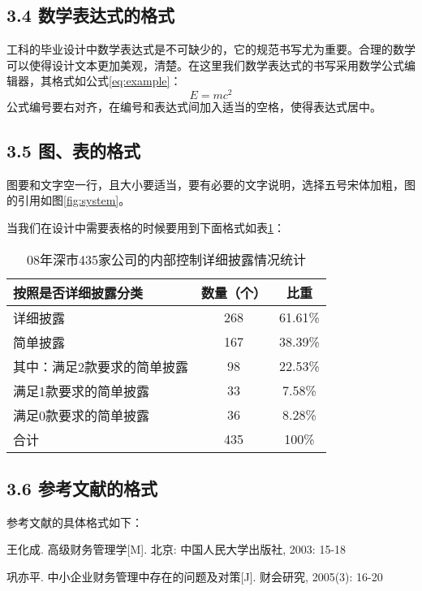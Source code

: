 \documentclass[12pt]{ctexart}
\begin{document}
\subsection{3.4 数学表达式的格式}
工科的毕业设计中数学表达式是不可缺少的，它的规范书写尤为重要。合理的数学可以使得设计文本更加美观，清楚。在这里我们数学表达式的书写采用数学公式编辑器，其格式如公式\eqref{eq:example}：
\[
E = mc^2 \label{eq:example}
\]
公式编号要右对齐，在编号和表达式间加入适当的空格，使得表达式居中。

\subsection{3.5 图、表的格式}
图要和文字空一行，且大小要适当，要有必要的文字说明，选择五号宋体加粗，图的引用如图\ref{fig:system}。
\begin{comment}
\begin{figure}[H]
  \centering
  \texttt{[image: system\_schematic.png]}
  \caption{位置随动系统原理图}
  \label{fig:system}
\end{figure}
\end{comment}
当我们在设计中需要表格的时候要用到下面格式如表\ref{table:statistics}：
\begin{table}[H]
  \centering
  \caption{08年深市435家公司的内部控制详细披露情况统计}
  \begin{tabular}{|l|c|c|}
    \hline
    按照是否详细披露分类 & 数量（个） & 比重 \\
    \hline
    详细披露 & 268 & 61.61\% \\
    \hline
    简单披露 & 167 & 38.39\% \\
    其中：满足2款要求的简单披露 & 98 & 22.53\% \\
    满足1款要求的简单披露 & 33 & 7.58\% \\
    满足0款要求的简单披露 & 36 & 8.28\% \\
    \hline
    合计 & 435 & 100\% \\
    \hline
  \end{tabular}
  \label{table:statistics}
\end{table}

\subsection{3.6 参考文献的格式}
参考文献的具体格式如下：
\begin{thebibliography}{99}
  \item 王化成. 高级财务管理学[M]. 北京: 中国人民大学出版社, 2003: 15-18
  \item 巩亦平. 中小企业财务管理中存在的问题及对策[J]. 财会研究, 2005(3): 16-20
\end{thebibliography}
\end{document}
